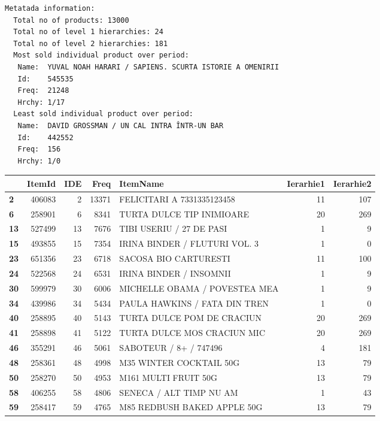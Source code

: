 \documentclass[11pt]{article}
\begin{document}
    \begin{Verbatim}[commandchars=\\\{\},fontsize=\footnotesize]
		Metatada information:
  Total no of products: 13000
  Total no of level 1 hierarchies: 24
  Total no of level 2 hierarchies: 181
  Most sold individual product over period:
   Name:  YUVAL NOAH HARARI / SAPIENS. SCURTA ISTORIE A OMENIRII
   Id:    545535
   Freq:  21248
   Hrchy: 1/17
  Least sold individual product over period:
   Name:  DAVID GROSSMAN / UN CAL INTRA ÎNTR-UN BAR
   Id:    442552
   Freq:  156
   Hrchy: 1/0

    \end{Verbatim}

	
		
    \scriptsize
\begin{tabular}{lrrrlrr}
\toprule
{} &  ItemId &  IDE &   Freq &                       ItemName &  Ierarhie1 &  Ierarhie2 \\
\midrule
\textbf{2 } &  406083 &    2 &  13371 &     FELICITARI A 7331335123458 &         11 &        107 \\
\textbf{6 } &  258901 &    6 &   8341 &      TURTA DULCE TIP INIMIOARE &         20 &        269 \\
\textbf{13} &  527499 &   13 &   7676 &       TIBI USERIU / 27 DE PASI &          1 &          9 \\
\textbf{15} &  493855 &   15 &   7354 &  IRINA BINDER / FLUTURI VOL. 3 &          1 &          0 \\
\textbf{23} &  651356 &   23 &   6718 &          SACOSA BIO CARTURESTI &         11 &        100 \\
\textbf{24} &  522568 &   24 &   6531 &        IRINA BINDER / INSOMNII &          1 &          9 \\
\textbf{30} &  599979 &   30 &   6006 &  MICHELLE OBAMA / POVESTEA MEA &          1 &          9 \\
\textbf{34} &  439986 &   34 &   5434 &  PAULA HAWKINS / FATA DIN TREN &          1 &          0 \\
\textbf{40} &  258895 &   40 &   5143 &     TURTA DULCE POM DE CRACIUN &         20 &        269 \\
\textbf{41} &  258898 &   41 &   5122 &    TURTA DULCE MOS CRACIUN MIC &         20 &        269 \\
\textbf{46} &  355291 &   46 &   5061 &         SABOTEUR / 8+ / 747496 &          4 &        181 \\
\textbf{48} &  258361 &   48 &   4998 &        M35 WINTER COCKTAIL 50G &         13 &         79 \\
\textbf{50} &  258270 &   50 &   4953 &           M161 MULTI FRUIT 50G &         13 &         79 \\
\textbf{58} &  406255 &   58 &   4806 &        SENECA / ALT TIMP NU AM &          1 &         43 \\
\textbf{59} &  258417 &   59 &   4765 &    M85 REDBUSH BAKED APPLE 50G &         13 &         79 \\
\bottomrule
\end{tabular}
\end{document}
